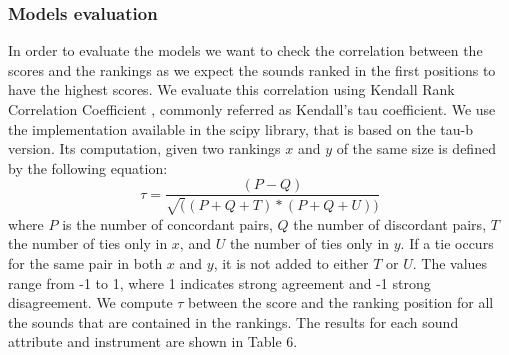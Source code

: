 \documentclass{article}
\begin{document}
\subsubsection{Models evaluation}
In order to evaluate the models we want to check the correlation between the scores and the rankings as we expect the sounds ranked in the first positions to have the highest scores. We evaluate this correlation using Kendall Rank Correlation Coefficient \cite{09}, commonly referred as Kendall’s tau coefficient. 
We use the implementation available in the scipy library, that is based on the tau-b version. Its computation, given two rankings $x$ and $y$ of the same size  is defined by the following equation:
\begin{equation}
\tau = \frac{(P - Q)} {\sqrt((P + Q + T)*(P + Q + U))}
\end{equation}
where $P$ is the number of concordant pairs, $Q$ the number of discordant pairs, $T$ the number of ties only in $x$, and $U$ the number of ties only in $y$. If a tie occurs for the same pair in both $x$ and $y$, it is not added to either $T$ or $U$.
The values range from -1 to 1, where 1 indicates strong agreement and -1 strong disagreement. 
We compute $\tau$ between the score and the ranking position for all the sounds that are contained in the rankings. 
The results for each sound attribute and instrument are shown in Table 6.
\end{document}
